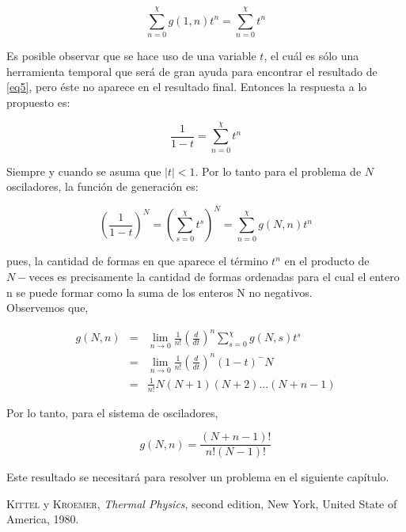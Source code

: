 \documentclass[a4paper,10pt]{article}
\begin{document}
\begin{equation}\label{eq3}
\sum_{n=0}^{\chi} g(1,n) t^n = \sum_{n=0}^{\chi} t^n 
\end{equation}

Es posible observar que se hace uso de una variable $t$, el cuál es sólo una herramienta temporal que será de gran ayuda para encontrar el resultado de \ref{eq5}, pero éste no aparece en el resultado final. 	Entonces la respuesta a lo propuesto es:

\begin{equation}\label{eq4}
\frac{1}{1-t} =  \sum_{n=0}^{\chi}  t^n
\end{equation}

Siempre y cuando se asuma que $|t | < 1$. Por lo tanto para el problema de $N$ osciladores, la función de generación es:

\begin{equation}\label{eq5}
\left( \frac{1}{1-t} \right)^N =  \left( \sum_{s=0}^{\chi}  t^s \right)^N = \sum_{n=0}^{\chi} g(N,n) t^n 
\end{equation}

pues, la cantidad de formas en que aparece el término $t^n$ en el producto de $N-\text{veces}$ es precisamente la cantidad de formas ordenadas para el cual el entero n se puede formar como la suma de los enteros N no negativos. \\

Observemos que,

\begin{eqnarray}\label{eq6}
g(N,n) &=& \lim_{n \to 0} \frac{1}{n!} \left( \frac{d}{dt} \right)^n \sum_{s=0}^{\chi} g(N,s)t^s \\
&=& \lim_{n \to 0} \frac{1}{n!} \left( \frac{d}{dt} \right)^n (1-t)^-N \\
&=& \frac{1}{n!} N (N+1) (N+2)... (N+n-1)
\end{eqnarray}

Por lo tanto, para el sistema de osciladores,

\begin{equation}
g(N,n) = \frac{(N+n-1)!}{n!(N-1)!}
\end{equation}

Este resultado se necesitará para resolver un problema en el siguiente capítulo.
\medskip

\begin{thebibliography}{X}
 \textsc{Kittel} y \textsc{Kroemer},
\textit{Thermal Physics}, second edition,
New York, United State of America, 1980.

\end{thebibliography}
\end{document}
